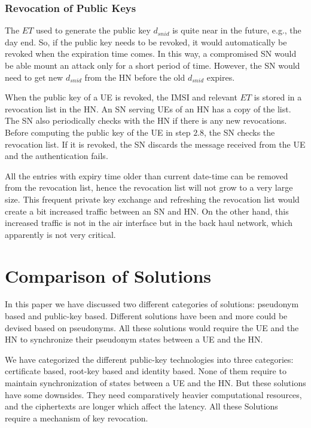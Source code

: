 \documentclass{river-journal}
\begin{document}
\subsubsection{Revocation of Public Keys}
The $ET$ used to generate the public key $d_{snid}$ is quite near in the future, e.g., the day end. So, if the public key needs to be revoked, it would automatically be revoked when the expiration time comes. In this way, a compromised SN would be able mount an attack only for a short period of time. However, the SN would need to get new $d_{snid}$ from the HN before the old $d_{snid}$ expires. 

When the public key of a UE is revoked, the IMSI and relevant $ET$ is stored in a revocation list in the HN.  An SN serving UEs of an HN has a copy of the list. The SN also periodically checks with the HN if there is any new revocations. Before computing the public key of the UE in step $2.8$, the SN checks the revocation list. If it is revoked, the SN discards the message received from the UE and the authentication fails. 

All the entries with expiry time older than current date-time can be removed from the revocation list, hence the revocation list will not grow to a very large size. This frequent private key exchange and refreshing the revocation list would create a bit increased traffic between an SN and HN. On the other hand, this increased traffic is not in the air interface but in the back haul network, which apparently is not very critical. 


\section{Comparison of Solutions}
\label{sec:evaluation}
In this paper we have discussed two different categories of solutions: pseudonym based and public-key based. Different solutions \cite{pseudonym_valtteri_philip,pseudonym_ericsson,CCS15,SSR15} have been and more could be devised based on pseudonyms. All these solutions would require the UE and the HN to synchronize their pseudonym states between a UE and the HN.

We have categorized the different public-key technologies into three categories: certificate based, root-key based and identity based. None of them require to maintain synchronization of states between a UE and the HN. But these solutions have some downsides. They need comparatively heavier computational resources, and the ciphertexts are longer which affect the latency. All these Solutions require a mechanism of key revocation.
\end{document}
